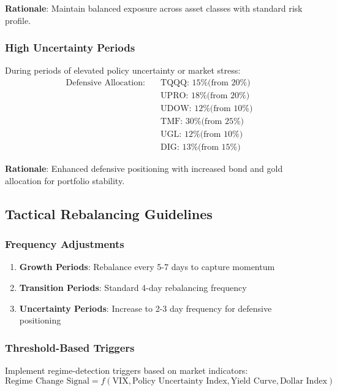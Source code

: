 \documentclass[onecolumn,ieee]{arithmaxresearch}
\begin{document}
\textbf{Rationale}: Maintain balanced exposure across asset classes with standard risk profile.

\subsubsection{High Uncertainty Periods}
During periods of elevated policy uncertainty or market stress:
\begin{align}
\text{Defensive Allocation:} \quad &\text{TQQQ: 15\% (from 20\%)} \\
&\text{UPRO: 18\% (from 20\%)} \\
&\text{UDOW: 12\% (from 10\%)} \\
&\text{TMF: 30\% (from 25\%)} \\
&\text{UGL: 12\% (from 10\%)} \\
&\text{DIG: 13\% (from 15\%)}
\end{align}

\textbf{Rationale}: Enhanced defensive positioning with increased bond and gold allocation for portfolio stability.

\subsection{Tactical Rebalancing Guidelines}

\subsubsection{Frequency Adjustments}
\begin{enumerate}
    \item \textbf{Growth Periods}: Rebalance every 5-7 days to capture momentum
    \item \textbf{Transition Periods}: Standard 4-day rebalancing frequency
    \item \textbf{Uncertainty Periods}: Increase to 2-3 day frequency for defensive positioning
\end{enumerate}

\subsubsection{Threshold-Based Triggers}
Implement regime-detection triggers based on market indicators:
\begin{equation}
\text{Regime Change Signal} = f(\text{VIX}, \text{Policy Uncertainty Index}, \text{Yield Curve}, \text{Dollar Index})
\end{equation}
\end{document}
